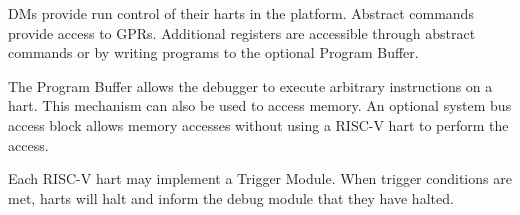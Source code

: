 DMs provide run control of their harts in the platform. Abstract commands
provide access to GPRs. Additional registers are accessible through abstract
commands or by writing programs to the optional Program Buffer.

The Program Buffer allows the debugger to execute arbitrary instructions on a
hart. This mechanism can also be used to access memory.  An optional system bus
access block allows memory accesses without using a RISC-V hart to perform the
access.

Each RISC-V hart may implement a Trigger Module. When trigger conditions
are met, harts will halt and inform the debug module that they have
halted.

